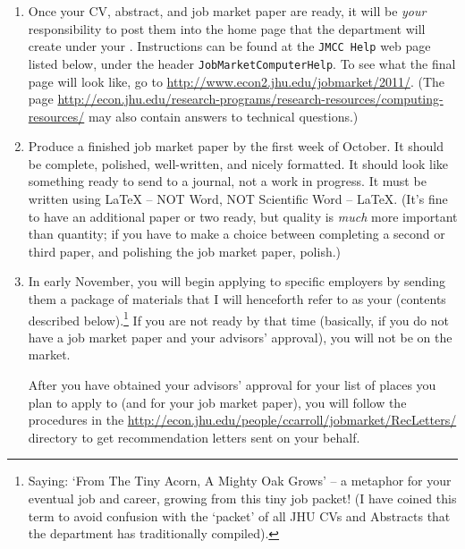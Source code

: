 \documentclass{econtex}
\begin{document}
\begin{enumerate}
\item Once your CV, abstract, and job market paper are ready, it will
  be {\it your} responsibility to post them into the home page that
  the department will create under your \Moniker.
  Instructions can be found at the \texttt{JMCC Help} web page listed
  below, under the header \texttt{JobMarketComputerHelp}.  To see what
  the final page will look like, go to
  \url{http://www.econ2.jhu.edu/jobmarket/2011/}.  (The page
  \url{http://econ.jhu.edu/research-programs/research-resources/computing-resources/}
  may also contain answers to technical questions.)

\item Produce a finished job market paper by the first week of October.  It should
  be complete, polished, well-written, and nicely formatted.  It
  should look like something ready to send to a journal, not a work in
  progress.  It must be written using {\LaTeX} -- NOT Word, NOT Scientific Word -- {\LaTeX}.  (It's fine to have an
  additional paper or two ready, but quality is {\it much} more
  important than quantity; if you have to make a choice between completing a second or third paper, and 
polishing the job market paper, polish.)
  
\item In early November, you will begin applying to specific employers
  by sending them a package of materials that I will henceforth refer
  to as your {\Acorn} (contents described below).\footnote{Saying: `From
    The Tiny Acorn, A Mighty Oak Grows' -- a metaphor for your eventual
    job and career, growing from this tiny job packet! (I have coined
    this term to avoid confusion with the `packet' of all JHU CVs and Abstracts that the department has traditionally compiled).}  If you are not
  ready by that time (basically, if you do not have a job market paper
  and your advisors' approval), you will not be on the market.
  
  After you have obtained your advisors' approval for your list of
  places you plan to apply to (and for your job market paper), you
  will follow the procedures in the
  \url{http://econ.jhu.edu/people/ccarroll/jobmarket/RecLetters/}
  directory to get recommendation letters sent on your behalf.


\end{enumerate}
\end{document}
